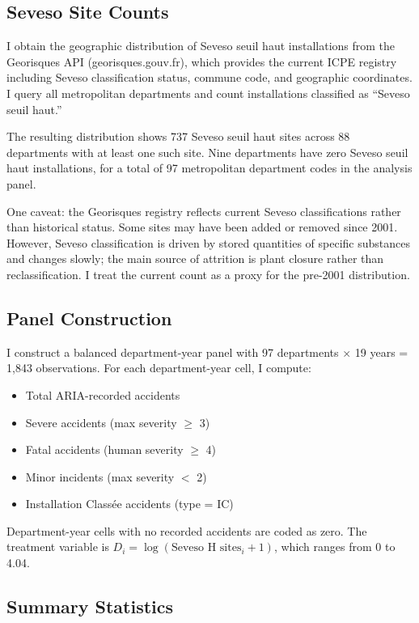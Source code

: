 \documentclass[12pt]{article}
\begin{document}
\subsection{Seveso Site Counts}

I obtain the geographic distribution of Seveso seuil haut installations from the Georisques API (georisques.gouv.fr), which provides the current ICPE registry including Seveso classification status, commune code, and geographic coordinates. I query all metropolitan departments and count installations classified as ``Seveso seuil haut.''

The resulting distribution shows 737 Seveso seuil haut sites across 88 departments with at least one such site. Nine departments have zero Seveso seuil haut installations, for a total of 97 metropolitan department codes in the analysis panel.

One caveat: the Georisques registry reflects current Seveso classifications rather than historical status. Some sites may have been added or removed since 2001. However, Seveso classification is driven by stored quantities of specific substances and changes slowly; the main source of attrition is plant closure rather than reclassification. I treat the current count as a proxy for the pre-2001 distribution.

\subsection{Panel Construction}

I construct a balanced department-year panel with 97 departments $\times$ 19 years = 1,843 observations. For each department-year cell, I compute:

\begin{itemize}
\item Total ARIA-recorded accidents
\item Severe accidents (max severity $\geq$ 3)
\item Fatal accidents (human severity $\geq$ 4)
\item Minor incidents (max severity $<$ 2)
\item Installation Class\'ee accidents (type = IC)
\end{itemize}

Department-year cells with no recorded accidents are coded as zero. The treatment variable is $D_i = \log(\text{Seveso H sites}_i + 1)$, which ranges from 0 to 4.04.

\subsection{Summary Statistics}
\end{document}
